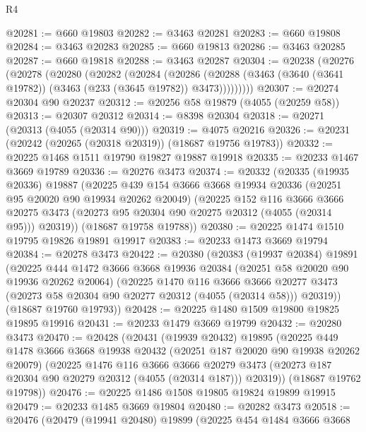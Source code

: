 \begin{lexlean}{R4}
\begin{coremodule}
@20281 := @660 @19803
@20282 := @3463 @20281
@20283 := @660 @19808
@20284 := @3463 @20283
@20285 := @660 @19813
@20286 := @3463 @20285
@20287 := @660 @19818
@20288 := @3463 @20287
@20304 := @20238
    (@20276
      (@20278
        (@20280
          (@20282
            (@20284
              (@20286
                (@20288 (@3463 (@3640 (@3641 @19782)) (@3463 (@233 (@3645 @19782)) @3473)))))))))
@20307 := @20274 @20304 @90 @20237
@20312 := @20256 @58 @19879 (@4055 (@20259 @58))
@20313 := @20307 @20312
@20314 := @8398 @20304
@20318 := @20271 (@20313 (@4055 (@20314 @90)))
@20319 := @4075 @20216
@20326 := @20231 (@20242 (@20265 (@20318 @20319)) (@18687 @19756 @19783))
@20332 := @20225 @1468 @1511 @19790 @19827 @19887 @19918
@20335 := @20233 @1467 @3669 @19789
@20336 := @20276 @3473
@20374 := @20332
    (@20335
      (@19935 @20336)
      @19887
      (@20225
        @439
        @154
        @3666
        @3668
        @19934
        @20336
        (@20251 @95 @20020 @90 @19934 @20262 @20049)
        (@20225
          @152
          @116
          @3666
          @3666
          @20275
          @3473
          (@20273 @95 @20304 @90 @20275 @20312 (@4055 (@20314 @95)))
          @20319))
      (@18687 @19758 @19788))
@20380 := @20225 @1474 @1510 @19795 @19826 @19891 @19917
@20383 := @20233 @1473 @3669 @19794
@20384 := @20278 @3473
@20422 := @20380
    (@20383
      (@19937 @20384)
      @19891
      (@20225
        @444
        @1472
        @3666
        @3668
        @19936
        @20384
        (@20251 @58 @20020 @90 @19936 @20262 @20064)
        (@20225
          @1470
          @116
          @3666
          @3666
          @20277
          @3473
          (@20273 @58 @20304 @90 @20277 @20312 (@4055 (@20314 @58)))
          @20319))
      (@18687 @19760 @19793))
@20428 := @20225 @1480 @1509 @19800 @19825 @19895 @19916
@20431 := @20233 @1479 @3669 @19799
@20432 := @20280 @3473
@20470 := @20428
    (@20431
      (@19939 @20432)
      @19895
      (@20225
        @449
        @1478
        @3666
        @3668
        @19938
        @20432
        (@20251 @187 @20020 @90 @19938 @20262 @20079)
        (@20225
          @1476
          @116
          @3666
          @3666
          @20279
          @3473
          (@20273 @187 @20304 @90 @20279 @20312 (@4055 (@20314 @187)))
          @20319))
      (@18687 @19762 @19798))
@20476 := @20225 @1486 @1508 @19805 @19824 @19899 @19915
@20479 := @20233 @1485 @3669 @19804
@20480 := @20282 @3473
@20518 := @20476
    (@20479
      (@19941 @20480)
      @19899
      (@20225
        @454
        @1484
        @3666
        @3668

\end{coremodule}
\end{lexlean}
